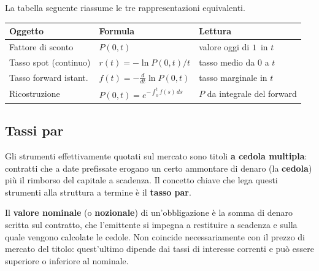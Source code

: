 \documentclass[11pt,a4paper]{article}
\theoremstyle{plain}
\theoremstyle{definition}
\theoremstyle{remark}
\begin{document}
\medskip
La tabella seguente riassume le tre rappresentazioni equivalenti.

\begin{center}
\renewcommand{\arraystretch}{1.4}
\begin{tabular}{lll}
\toprule
\textbf{Oggetto} & \textbf{Formula} & \textbf{Lettura} \\
\midrule
Fattore di sconto & $P(0,t)$ & valore oggi di $1$\,\texteuro{} in $t$ \\
Tasso spot (continuo) & $r(t) = -\ln P(0,t)/t$ & tasso medio da $0$ a $t$ \\
Tasso forward istant. & $f(t) = -\tfrac{d}{dt}\ln P(0,t)$ & tasso marginale in $t$ \\
Ricostruzione & $P(0,t) = e^{-\int_0^t f(s)\,ds}$ & $P$ da integrale del forward \\
\bottomrule
\end{tabular}
\end{center}

\subsection{Tassi par}
\label{sec:inputdati}

Gli strumenti effettivamente quotati sul mercato sono titoli \textbf{a cedola multipla}:
contratti che a date prefissate erogano un certo ammontare di denaro (la \textbf{cedola})
pi\`u il rimborso del capitale a scadenza. Il concetto chiave che lega questi strumenti
alla struttura a termine \`e il \textbf{tasso par}.

Il \textbf{valore nominale} (o \textbf{nozionale}) di un'obbligazione \`e la somma di
denaro scritta sul contratto, che l'emittente si impegna a restituire a scadenza e sulla
quale vengono calcolate le cedole. Non coincide necessariamente con il prezzo di mercato
del titolo: quest'ultimo dipende dai tassi di interesse correnti e pu\`o essere superiore
o inferiore al nominale.
\end{document}
